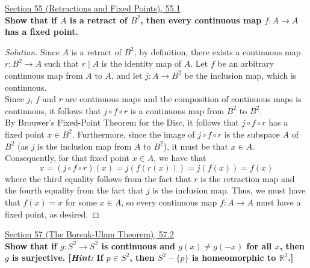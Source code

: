 \documentclass[11pt]{article}
\newcommand{\R}{\mathbb{R}}
\newenvironment{solution}
  {\renewcommand\qedsymbol{$\blacksquare$}\begin{proof}[Solution]}
  {\end{proof}}
\begin{document}
\underline{Section 55 (Retractions and Fixed Points), 55.1} \\

\textbf{Show that if $A$ is a retract of $B^2$, then every continuous map $f\colon A \rightarrow A$ has a fixed point.}

\begin{solution}
Since $A$ is a retract of $B^2$, by definition, there exists a continuous map $r\colon B^2 \rightarrow A$ such that $r \mid A$ is the identity map of $A$. Let $f$ be an arbitrary continuous map from $A$ to $A$, and
let $j\colon A \rightarrow B^2$ be the inclusion map, which is continuous. \\

Since $j$, $f$ and $r$ are continuous maps and the composition of continuous maps is continuous, it follows that $j \circ f \circ r$ is a continuous map from $B^2$ to $B^2$. \\

By Brouwer's Fixed-Point Theorem for the Disc, it follows that $j \circ f \circ r$ has a fixed point $x \in B^2$. Furthermore, since the image of $j \circ f \circ r$ is the subspace $A$ of $B^2$ (as $j$ is
the inclusion map from $A$ to $B^2$), it must be that $x \in A$. Consequently, for that fixed point $x \in A$, we have that
\[
    x = (j \circ f \circ r)(x) = j(f(r(x))) = j(f(x)) = f(x)
\]
where the third equality follows from the fact that $r$ is the retraction map and the fourth equality from the fact that $j$ is the inclusion map. 
Thus, we must have that $f(x) = x$ for some $x \in A$, so every continuous map $f\colon A \rightarrow A$ must have a fixed point, as desired.
\end{solution}

\newpage


\underline{Section 57 (The Borsuk-Ulam Theorem), 57.2} \\

\textbf{Show that if $g\colon S^2 \rightarrow S^2$ is continuous and $g(x) \neq g(-x)$ for all $x$, then $g$ is surjective. [\textit{Hint:} If $p \in S^2$, then $S^2 \text{ -- } \{ p \}$ is homeomorphic to $\R^2$.]}
\end{document}
